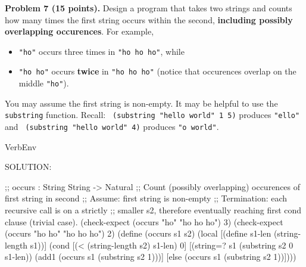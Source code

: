 \documentclass[12pt]{article}
\begin{document}



\newpage


\noindent
{\bf Problem 7 (15 points).} Design a program that takes two
strings and counts how many times the first string occurs within the
second, {\bf including possibly overlapping occurences}.
For example,
\begin{itemize}
\item {\tt "ho"} occurs three times in {\tt "ho ho ho"}, while
\item {\tt "ho ho"} occurs {\bf twice} in {\tt "ho ho ho"} (notice that occurences
  overlap on the middle {\tt "ho"}).
\end{itemize}
You may assume the first string is non-empty.
%
It may be helpful to use the {\tt substring} function.  Recall: {\tt
  (substring "hello world" 1 5)} produces {\tt "ello"} and {\tt
  (substring "hello world" 4)} produces {\tt "o world"}.


\begin{SaveVerbatim}{VerbEnv}


SOLUTION:

;; occurs : String String -> Natural
;; Count (possibly overlapping) occurences of first string in second
;; Assume: first string is non-empty
;; Termination: each recursive call is on a strictly
;; smaller s2, therefore eventually reaching first cond clause (trivial case).
(check-expect (occurs "ho" "ho ho ho") 3)
(check-expect (occurs "ho ho" "ho ho ho") 2)
(define (occurs s1 s2)
  (local [(define s1-len (string-length s1))]
    (cond [(< (string-length s2) s1-len) 0]
          [(string=? s1 (substring s2 0 s1-len))
           (add1 (occurs s1 (substring s2 1)))]
          [else
           (occurs s1 (substring s2 1))])))
\end{SaveVerbatim}




\end{document}
